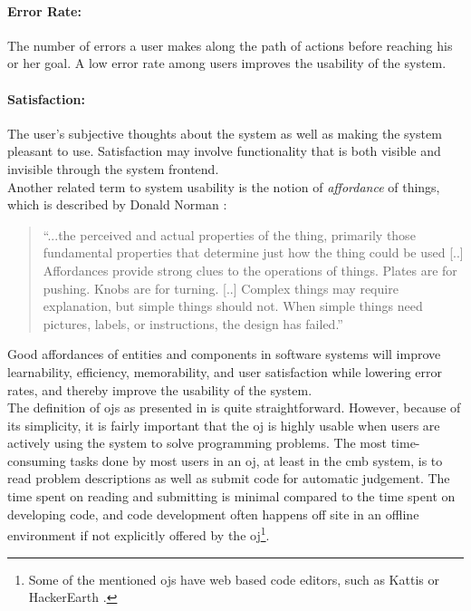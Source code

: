 \paragraph*{Error Rate:} The number of errors a user makes along the path of actions before reaching his or her goal. A low error rate among users improves the usability of the system.

\paragraph*{Satisfaction:} The user's subjective thoughts about the system as well as making the system pleasant to use. Satisfaction may involve functionality that is both visible and invisible through the system frontend.\\

Another related term to system usability is the notion of \textit{affordance} of things, which is described by Donald Norman \cite{norman1988design}:
\blockquote{``...the perceived and actual properties of the thing, primarily those fundamental properties that determine just how the thing could be used [..] Affordances provide strong clues to the operations of things. Plates are for pushing. Knobs are for turning. [..] Complex things may require explanation, but simple things should not. When simple things need pictures, labels, or instructions, the design has failed.''}

Good affordances of entities and components in software systems will improve learnability, efficiency, memorability, and user satisfaction while lowering error rates, and thereby improve the usability of the system. \\

The definition of \glspl{oj} as presented in  is quite straightforward. However, because of its simplicity, it is fairly important that the \gls{oj} is highly usable when users are actively using the system to solve programming problems. The most time-consuming tasks done by most users in an \gls{oj}, at least in the \gls{cmb} system, is to read problem descriptions as well as submit code for automatic judgement. The time spent on reading and submitting is minimal compared to the time spent on developing code, and code development often happens off site in an offline environment if not explicitly offered by the \gls{oj}\footnote{Some of the mentioned \glspl{oj} have web based code editors, such as Kattis \cite{KATTIS} or HackerEarth \cite{HACKEREARTH}.}. \\

